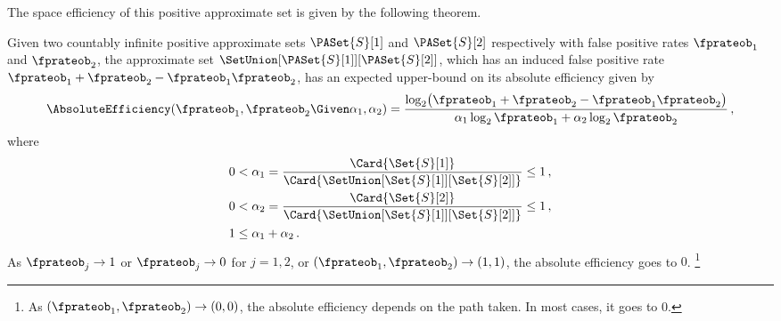 \documentclass[ ../main.tex]{subfiles}
\begin{document}
The space efficiency of this positive approximate set is given by the following 
theorem.
\begin{theorem}
\label{thm:union_space_complexity}
Given two countably infinite positive approximate sets $\PASet{S}[1]$ and 
$\PASet{S}[2]$ respectively with false positive rates $\fprateob_1$ and 
$\fprateob_2$, the approximate set $\SetUnion[\PASet{S}[1]][\PASet{S}[2]]$, 
which has an induced false positive rate 
    $\fprateob_1 + \fprateob_2 - \fprateob_1 \fprateob_2$,
has an expected upper-bound on its absolute efficiency given by
\begin{equation}
\label{eq:union_space_complexity}
    \AbsoluteEfficiency(\fprateob_1, \fprateob_2 \Given \alpha_1, \alpha_2) =
    \frac{
        \log_2\!\left(
        \fprateob_1 + \fprateob_2 - \fprateob_1 \fprateob_2
        \right)}
        {
            \alpha_1 \log_2 \fprateob_1 + \alpha_2 \log_2 \fprateob_2
        }\,,
\end{equation}
where
\begin{equation}
\label{eq:union_space_complexity_bounds}
\begin{split}
    0 &< \alpha_1 = \frac{\Card{\Set{S}[1]}}
        {\Card{\SetUnion[\Set{S}[1]][\Set{S}[2]]}} \leq 1\,,\\
    0 &< \alpha_2 = \frac{\Card{\Set{S}[2]}}
        {\Card{\SetUnion[\Set{S}[1]][\Set{S}[2]]}} \leq 1\,,\\
    1 &\leq \alpha_1 + \alpha_2\,.
\end{split}
\end{equation}
As $\fprateob_j \to 1$ or $\fprateob_j \to 0$ for $j=1,2$, or 
    $(\fprateob_1, \fprateob_2) \to (1,1)$, 
the absolute efficiency goes to $0$.
\footnote{As $(\fprateob_1,\fprateob_2) \to (0,0)$, the absolute efficiency 
depends on the path taken. In most cases, it goes to $0$.}
\end{theorem}
\end{document}
